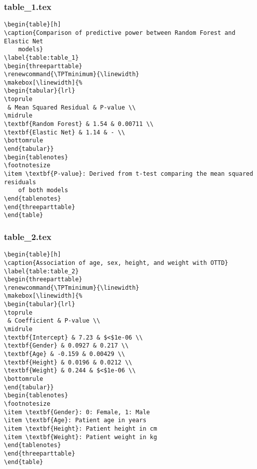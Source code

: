 \documentclass[11pt]{article}
\begin{document}
\subsubsection*{table\_1.tex}

\begin{Verbatim}[tabsize=4]
\begin{table}[h]
\caption{Comparison of predictive power between Random Forest and Elastic Net
	models}
\label{table:table_1}
\begin{threeparttable}
\renewcommand{\TPTminimum}{\linewidth}
\makebox[\linewidth]{%
\begin{tabular}{lrl}
\toprule
 & Mean Squared Residual & P-value \\
\midrule
\textbf{Random Forest} & 1.54 & 0.00711 \\
\textbf{Elastic Net} & 1.14 & - \\
\bottomrule
\end{tabular}}
\begin{tablenotes}
\footnotesize
\item \textbf{P-value}: Derived from t-test comparing the mean squared residuals
	of both models
\end{tablenotes}
\end{threeparttable}
\end{table}

\end{Verbatim}

\subsubsection*{table\_2.tex}

\begin{Verbatim}[tabsize=4]
\begin{table}[h]
\caption{Association of age, sex, height, and weight with OTTD}
\label{table:table_2}
\begin{threeparttable}
\renewcommand{\TPTminimum}{\linewidth}
\makebox[\linewidth]{%
\begin{tabular}{lrl}
\toprule
 & Coefficient & P-value \\
\midrule
\textbf{Intercept} & 7.23 & $<$1e-06 \\
\textbf{Gender} & 0.0927 & 0.217 \\
\textbf{Age} & -0.159 & 0.00429 \\
\textbf{Height} & 0.0196 & 0.0212 \\
\textbf{Weight} & 0.244 & $<$1e-06 \\
\bottomrule
\end{tabular}}
\begin{tablenotes}
\footnotesize
\item \textbf{Gender}: 0: Female, 1: Male
\item \textbf{Age}: Patient age in years
\item \textbf{Height}: Patient height in cm
\item \textbf{Weight}: Patient weight in kg
\end{tablenotes}
\end{threeparttable}
\end{table}

\end{Verbatim}
\end{document}

